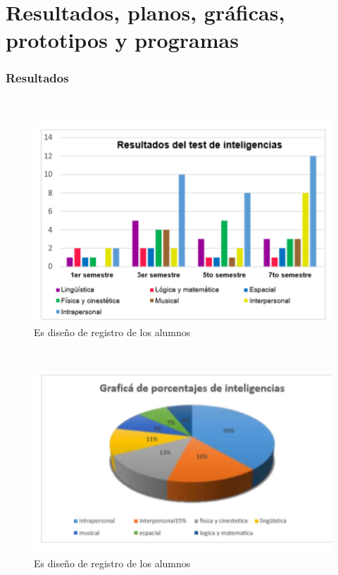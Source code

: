 \documentclass[letterpaper,oneside,openany,11pt]{book}
\begin{document}
\chapter{Resultados, planos, gráficas, prototipos y programas}\label{cap.resultados}

\subsection{ Resultados}
\noindent \\

 \begin{figure}[H]
	\centering
	\includegraphics[width=1.0\textwidth]{./Imagenes/33}
	\caption{Es diseño de registro de los alumnos}
\end{figure}

\noindent \\

 \begin{figure}[H]
	\centering
	\includegraphics[width=1.0\textwidth]{./Imagenes/34}
	\caption{Es diseño de registro de los alumnos}
\end{figure}
\end{document}
